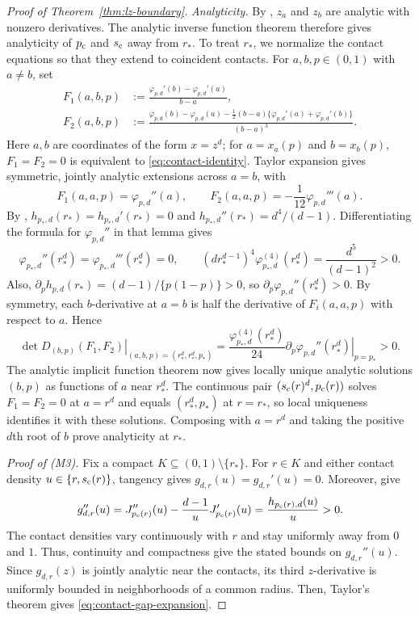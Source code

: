 \begin{proof}[Proof of Theorem~\ref{thm:lz-boundary}]
\emph{Analyticity.}
By , $z_a$ and $z_b$ are analytic with nonzero
derivatives.  The analytic inverse function theorem therefore gives
analyticity of $\pc$ and $\sc$ away from $r_*$.
To treat $r_*$, we normalize the contact equations so that they extend to
coincident contacts.  For $a,b,p\in(0,1)$ with $a\ne b$, set
\begin{align*}
  F_1(a,b,p)&:=\frac{\varphi_{p,d}'(b)-\varphi_{p,d}'(a)}{b-a},\\
  F_2(a,b,p)&:=\frac{\varphi_{p,d}(b)-\varphi_{p,d}(a)
    -\frac12(b-a)\{\varphi_{p,d}'(a)+\varphi_{p,d}'(b)\}}{(b-a)^3}.
\end{align*}
Here $a,b$ are coordinates of the form $x=z^d$; for $a=x_a(p)$ and $b=x_b(p)$,
$F_1=F_2=0$ is equivalent to \eqref{eq:contact-identity}.  Taylor expansion gives
symmetric, jointly analytic extensions across $a=b$, with
\[
  F_1(a,a,p)=\varphi_{p,d}''(a),
  \qquad
  F_2(a,a,p)=-\frac1{12}\varphi_{p,d}'''(a).
\]
By , $h_{p_*,d}(r_*)=h_{p_*,d}'(r_*)=0$ and
$h_{p_*,d}''(r_*)=d^4/(d-1)$.  Differentiating the formula for
$\varphi_{p,d}''$ in that lemma gives
\begin{equation}\label{eq:endpoint-contact-derivatives}
  \varphi_{p_*,d}''(r_*^d)=\varphi_{p_*,d}'''(r_*^d)=0,
  \qquad
  (d r_*^{d-1})^4\varphi_{p_*,d}^{(4)}(r_*^d)
  =\frac{d^5}{(d-1)^2}>0.
\end{equation}
Also, $\partial_p h_{p,d}(r_*)=(d-1)/\{p(1-p)\}>0$, so
$\partial_p\varphi_{p,d}''(r_*^d)>0$.
By symmetry, each $b$-derivative at $a=b$ is half the derivative of
$F_i(a,a,p)$ with respect to $a$.  Hence
\[
  \left.\det D_{(b,p)}(F_1,F_2)\right|_{(a,b,p)=(r_*^d,r_*^d,p_*)}
  =\frac{\varphi_{p_*,d}^{(4)}(r_*^d)}{24}
    \left.\partial_p\varphi_{p,d}''(r_*^d)\right|_{p=p_*}>0.
\]
The analytic implicit function theorem now gives locally unique analytic
solutions $(b,p)$ as functions of $a$ near $r_*^d$.
The continuous pair $(\sc(r)^d,\pc(r))$ solves $F_1=F_2=0$ at $a=r^d$
and equals $(r_*^d,p_*)$ at $r=r_*$, so local uniqueness identifies it
with these solutions.  Composing with $a=r^d$ and taking the positive
$d$th root of $b$ prove analyticity at $r_*$.

\emph{Proof of (M3).}
Fix a compact $K\subseteq(0,1)\setminus\{r_*\}$.
For $r\in K$ and either contact density $u\in\{r,\sc(r)\}$, tangency gives
$g_{d,r}(u)=g_{d,r}'(u)=0$.  Moreover,  give
\[
  g_{d,r}''(u)
  =J_{\pc(r)}''(u)-\frac{d-1}{u}J_{\pc(r)}'(u)
  =\frac{h_{\pc(r),d}(u)}{u}>0.
\]
The contact densities vary continuously with $r$ and stay uniformly away
from $0$ and $1$.  Thus, continuity and compactness give the stated bounds
on $g_{d,r}''(u)$.  Since $g_{d,r}(z)$ is jointly analytic near the contacts, its
third $z$-derivative is uniformly bounded in neighborhoods of a common radius.
Then, Taylor's theorem gives \eqref{eq:contact-gap-expansion}.


\end{proof}
